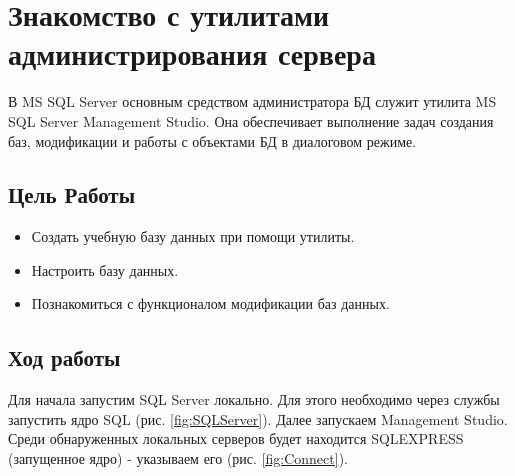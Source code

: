\tableofcontents
\newpage
\section{Знакомство с утилитами администрирования сервера}
\label{GL1}
 В MS SQL Server основным средством администратора БД служит утилита MS SQL Server Management Studio. Она обеспечивает выполнение задач создания баз, модификации и работы с объектами БД в диалоговом режиме.
\subsection{Цель Работы}
\begin{itemize}
    \item Создать учебную базу данных при помощи утилиты.
    \item Настроить базу данных.
    \item Познакомиться с функционалом модификации баз данных.
\end{itemize}
\subsection{Ход работы}

Для начала запустим SQL Server локально. Для этого необходимо через службы запустить ядро SQL (рис. \ref{fig:SQLServer}). Далее запускаем Management Studio. Среди обнаруженных локальных серверов будет находится SQLEXPRESS (запущенное ядро) - указываем его (рис. \ref{fig:Connect}). 

